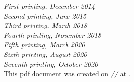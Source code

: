 \documentclass[11pt,fleqn]{book} %
\begin{document}
\noindent \textit{First printing, December 2014} \\  %
\noindent \textit{Second printing, June 2015}    \\  %
\noindent \textit{Third printing, March 2018}    \\  %
\noindent \textit{Fourth printing, November 2018} \\ %
\noindent \textit{Fifth printing, March 2020} \\ %
\noindent \textit{Sixth printing, August 2020} \\ %
\noindent \textit{Seventh printing, October 2020} \\ %

\noindent This pdf document was created on \textit{\the\day/\the\month/\the\year} at \textit{\DTMcurrenttime}.



\pagestyle{empty} %


\tableofcontents %
\listoftables
\listoffigures
\lstlistoflistings

\cleardoublepage %

\pagestyle{fancy} %


\mainmatter


\backmatter


\end{document}
